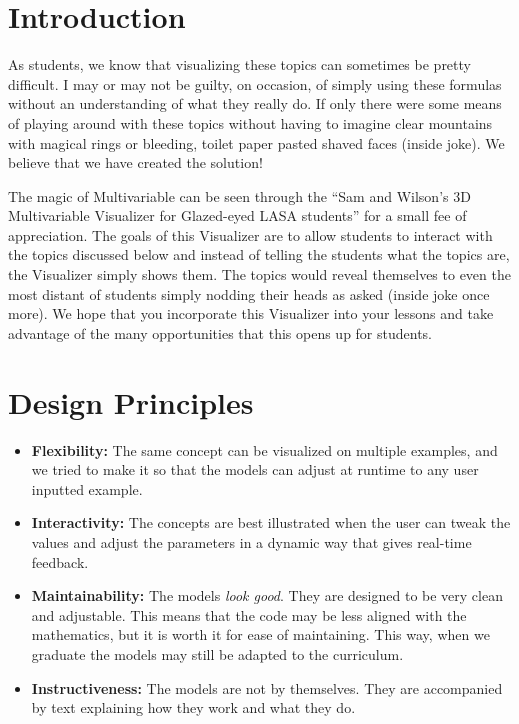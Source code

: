 \documentclass[12pt,letterpaper,english]{article}
\begin{document}
\tableofcontents

\clearpage

\doublespacing

\section{Introduction}

 As students, we know that visualizing these topics can sometimes be pretty difficult. I may or may not be guilty, on occasion, of simply using these formulas without an understanding of what they really do. If only there were some means of playing around with these topics without having to imagine clear mountains with magical rings or bleeding, toilet paper pasted shaved faces (inside joke). We believe that we have created the solution!

 The magic of Multivariable can be seen through the “Sam and Wilson’s 3D Multivariable Visualizer for Glazed-eyed LASA students” for a small fee of appreciation. The goals of this Visualizer are to allow students to interact with the topics discussed below and instead of telling the students  what the topics are, the Visualizer simply shows them. The topics would reveal themselves to even the most distant of students simply nodding their heads as asked (inside joke once more). We hope that you incorporate this Visualizer into your lessons and take advantage of the many opportunities that this opens up for students.

\section{Design Principles}

\begin{itemize}
\item \textbf{Flexibility:} The same concept can be visualized on multiple examples, and we tried to make it so that the models can adjust at runtime to any user inputted example.
\item \textbf{Interactivity:} The concepts are best illustrated when the user can tweak the values and adjust the parameters in a dynamic way that gives real-time feedback.
\item \textbf{Maintainability:} The models \textit{look good}. They are designed to be very clean and adjustable. This means that the code may be less aligned with the mathematics, but it is worth it for ease of maintaining. This way, when we graduate the models may still be adapted to the curriculum.
\item \textbf{Instructiveness:} The models are not by themselves. They are accompanied by text %
explaining how they work and what they do.
\end{itemize}
\end{document}
